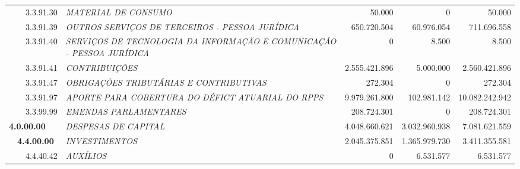 \documentclass{article}
\begin{document}
\begin{longtable}[c]{m{0.1cm}m{0.1cm}m{0.8cm}|m{8cm}|m{2cm}|m{2cm}|m{2cm}}
\multicolumn{1}{l}{} & \multicolumn{1}{l}{} & \multicolumn{1}{l|}{3.3.91.30} & \multicolumn{1}{L{8cm}|}{\textit{MATERIAL DE CONSUMO}} & \multicolumn{1}{r|}{50.000} & \multicolumn{1}{r|}{             0} &  \multicolumn{1}{r}{50.000}\\
\multicolumn{1}{l}{} & \multicolumn{1}{l}{} & \multicolumn{1}{l|}{3.3.91.39} & \multicolumn{1}{L{8cm}|}{\textit{OUTROS SERVIÇOS DE TERCEIROS - PESSOA JURÍDICA}} & \multicolumn{1}{r|}{650.720.504} & \multicolumn{1}{r|}{60.976.054} &  \multicolumn{1}{r}{711.696.558}\\
\multicolumn{1}{l}{} & \multicolumn{1}{l}{} & \multicolumn{1}{l|}{3.3.91.40} & \multicolumn{1}{L{8cm}|}{\textit{SERVIÇOS DE TECNOLOGIA DA INFORMAÇÃO E COMUNICAÇÃO -  PESSOA JURÍDICA}} & \multicolumn{1}{r|}{             0} & \multicolumn{1}{r|}{8.500} &  \multicolumn{1}{r}{8.500}\\
\multicolumn{1}{l}{} & \multicolumn{1}{l}{} & \multicolumn{1}{l|}{3.3.91.41} & \multicolumn{1}{L{8cm}|}{\textit{CONTRIBUIÇÕES}} & \multicolumn{1}{r|}{2.555.421.896} & \multicolumn{1}{r|}{5.000.000} &  \multicolumn{1}{r}{2.560.421.896}\\
\multicolumn{1}{l}{} & \multicolumn{1}{l}{} & \multicolumn{1}{l|}{3.3.91.47} & \multicolumn{1}{L{8cm}|}{\textit{OBRIGAÇÕES TRIBUTÁRIAS E CONTRIBUTIVAS}} & \multicolumn{1}{r|}{272.304} & \multicolumn{1}{r|}{             0} &  \multicolumn{1}{r}{272.304}\\
\multicolumn{1}{l}{} & \multicolumn{1}{l}{} & \multicolumn{1}{l|}{3.3.91.97} & \multicolumn{1}{L{8cm}|}{\textit{APORTE PARA COBERTURA DO DÉFICT ATUARIAL DO RPPS}} & \multicolumn{1}{r|}{9.979.261.800} & \multicolumn{1}{r|}{102.981.142} &  \multicolumn{1}{r}{10.082.242.942}\\
\multicolumn{1}{l}{} & \multicolumn{1}{l}{} & \multicolumn{1}{l|}{3.3.99.99} & \multicolumn{1}{L{8cm}|}{\textit{EMENDAS PARLAMENTARES}} & \multicolumn{1}{r|}{208.724.301} & \multicolumn{1}{r|}{             0} &  \multicolumn{1}{r}{208.724.301}\\
\multicolumn{3}{l|}{\textbf{4.0.00.00}} & \multicolumn{1}{L{8cm}|}{\textit{DESPESAS DE CAPITAL}} & \multicolumn{1}{r|}{4.048.660.621} & \multicolumn{1}{r|}{3.032.960.938} &  \multicolumn{1}{r}{7.081.621.559}\\
\multicolumn{1}{l}{} & \multicolumn{2}{l|}{\textbf{4.4.00.00}} & \multicolumn{1}{L{8cm}|}{\textit{INVESTIMENTOS}} & \multicolumn{1}{r|}{2.045.375.851} & \multicolumn{1}{r|}{1.365.979.730} &  \multicolumn{1}{r}{3.411.355.581}\\
\multicolumn{1}{l}{} & \multicolumn{1}{l}{} & \multicolumn{1}{l|}{4.4.40.42} & \multicolumn{1}{L{8cm}|}{\textit{AUXÍLIOS}} & \multicolumn{1}{r|}{             0} & \multicolumn{1}{r|}{6.531.577} &  \multicolumn{1}{r}{6.531.577}\\

\end{longtable}
\end{document}
